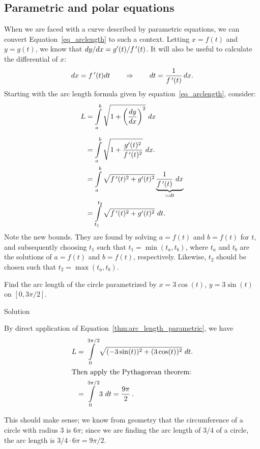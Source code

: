 \subsection{Parametric and polar equations}

When we are faced with a curve described by parametric equations, we can convert Equation~\eqref{eq_arclength} to such a context.  Letting $x=f(t)$ and $y=g(t)$, we know that $dy/dx = g'(t)/f\,'(t)$. It will also be useful to calculate the differential of $x$: 
$$dx = f\,'(t)dt \qquad \Rightarrow \qquad dt = \frac{1}{f\,'(t)}\,dx.$$
Starting with the arc length formula given by equation~\eqref{eq_arclength}, consider:
\begin{align}
L &= \int\limits_a^b\sqrt{1+\left(\frac{dy}{dx}\right)^2}\ dx\nonumber\\[0.2cm]
		&= \int\limits_a^b \sqrt{1+\frac{g'(t)^2}{\fp(t)^2}}\ dx\nonumber. \\
		&= \int\limits_a^b \sqrt{\fp(t)^2+g'(t)^2}\underbrace{\frac1{\fp(t)}\ dx}_{=dt}\nonumber\\
		&= \int\limits_{t_1}^{t_2} \sqrt{\fp(t)^2+g'(t)^2}\ dt.\nonumber\label{thm:arc_length_parametric}\\
\end{align}
Note the new bounds. They are found by solving $a= f(t)$ and $b=f(t)$ for $t$, and subsequently choosing $t_1$ such that $t_1=\min(t_a,t_b)$, where $t_a$ and $t_b$ are the solutions of  $a= f(t)$ and $b=f(t)$, respectively. Likewise, $t_2$ should be chosen such that $t_2=\max(t_a,t_b)$.

\begin{example}\label{ex_parcalc6}
Find the arc length of the circle parametrized by $x=3\cos(t)$, $y=3\sin(t)$ on $[0,3\pi/2]$. 

Solution 

By direct application of Equation~\eqref{thm:arc_length_parametric}, we have
\begin{align*}
L &= \ds\int\limits_0^{3\pi/2} \sqrt{(-3\sin(t))^2 +(3\cos(t))^2} \ dt.\\
\intertext{Then apply the Pythagorean theorem:}
	&= \ds\int\limits_0^{3\pi/2} 3 \ dt= \dfrac{9\pi}{2}\,.
	\end{align*}
	
This should make sense; we know from geometry that the circumference of a circle with radius 3 is $6\pi$; since we are finding the arc length of $3/4$ of a circle, the arc length is $3/4\cdot 6\pi = 9\pi/2$.
\end{example}

